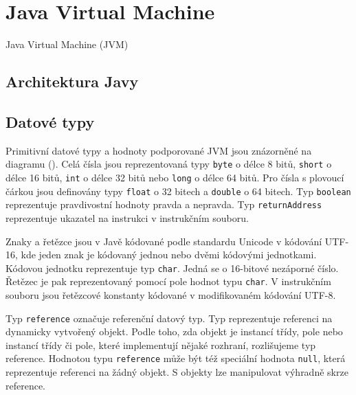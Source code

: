 \chapter{Java Virtual Machine}




Java Virtual Machine (JVM)

\section{Architektura Javy}




\section{Datové typy}


Primitivní datové typy a hodnoty podporované JVM jsou znázorněné na diagramu (). Celá čísla jsou reprezentovaná typy \texttt{byte} o délce 8 bitů, \texttt{short} o délce 16 bitů, \texttt{int} o délce 32 bitů nebo \texttt{long} o délce 64 bitů. Pro čísla s plovoucí čárkou jsou definovány typy \texttt{float} o 32 bitech a \texttt{double} o 64 bitech. Typ \texttt{boolean} reprezentuje pravdivostní hodnoty pravda a nepravda. Typ \texttt{returnAddress} reprezentuje ukazatel na instrukci v instrukčním souboru.

Znaky a řetězce jsou v Javě kódované podle standardu Unicode v kódování UTF-16, kde jeden znak je kódovaný jednou nebo dvěmi kódovými jednotkami. Kódovou jednotku reprezentuje typ \texttt{char}. Jedná se o 16-bitové nezáporné číslo. Řetězec je pak reprezentovaný pomocí pole hodnot typu \texttt{char}. V instrukčním souboru jsou řetězcové konstanty kódované v modifikovaném kódování UTF-8. 

Typ \texttt{reference} označuje referenční datový typ. Typ reprezentuje referenci na dynamicky vytvořený objekt. Podle toho, zda objekt je instancí třídy, pole nebo instancí třídy či pole, které implementují nějaké rozhraní, rozlišujeme typ reference. Hodnotou typu \texttt{reference} může být též speciální hodnota \texttt{null}, která reprezentuje referenci na žádný objekt. S objekty lze manipulovat výhradně skrze reference.


